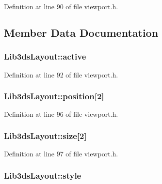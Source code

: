 Definition at line 90 of file viewport.\-h.



\subsection{Member Data Documentation}
\hypertarget{struct_lib3ds_layout_a491bd85fe10158f50451a21a62002ea4}{
\subsubsection[{active}]{ Lib3ds\-Layout\-::active}}\label{struct_lib3ds_layout_a491bd85fe10158f50451a21a62002ea4}


Definition at line 92 of file viewport.\-h.

\hypertarget{struct_lib3ds_layout_a7e59a51c39282db6dc9d76163d6cb0c7}{
\subsubsection[{position}]{ Lib3ds\-Layout\-::position\mbox{[}2\mbox{]}}}\label{struct_lib3ds_layout_a7e59a51c39282db6dc9d76163d6cb0c7}


Definition at line 96 of file viewport.\-h.

\hypertarget{struct_lib3ds_layout_ad3f8c67e1b9562d703525c36149a6819}{
\subsubsection[{size}]{ Lib3ds\-Layout\-::size\mbox{[}2\mbox{]}}}\label{struct_lib3ds_layout_ad3f8c67e1b9562d703525c36149a6819}


Definition at line 97 of file viewport.\-h.

\hypertarget{struct_lib3ds_layout_a770e9b04d593892297c92abbfebec7dd}{
\subsubsection[{style}]{ Lib3ds\-Layout\-::style}}\label{struct_lib3ds_layout_a770e9b04d593892297c92abbfebec7dd}


